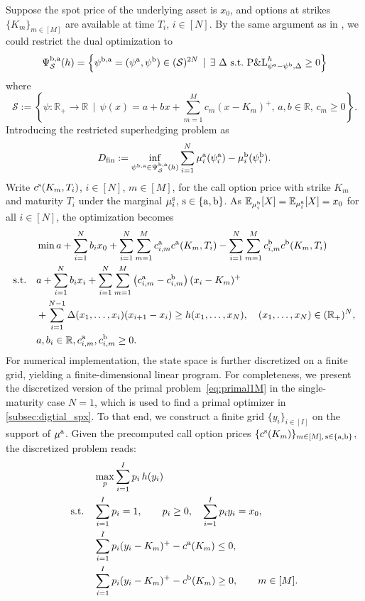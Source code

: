 \documentclass[11pt]{article}
\newcommand{\cS}{\mathcal{S}}
\newcommand{\R}{\mathbb{R}} %
\theoremstyle{plain}
\theoremstyle{definition}
\theoremstyle{remark}
\newcommand{\E}{\mathbb{E}}
\theoremstyle{plain}
\begin{document}
Suppose the spot price of the underlying asset is $x_0$, and options at strikes $\{K_{m}\}_{m\in[M]}$ are available at time $T_i$, $i\in [N]$. By the same argument as in \cite{beiglbock2013model}, we could restrict the dual optimization to 
\[
\Psi^{\rm b,a}_{\cS}(h) =\left\{\psi^{\rm b,a} =(\psi^{\rm a},\psi^{\rm b}) \in (\cS)^{2N}\,\mid\,  \exists\,\, \Delta\,\,{\rm s.t.}\,\, {\rm P\&L}^h_{\psi^{\rm a}-\psi^{\rm b}, \Delta}\geq 0\right\}
\]
where
\[
\cS :=\left\{\psi:\R_+\to \R\,\mid\, \psi(x)=a+ bx + \sum_{m=1}^M c_m(x-K_m)^+,\,a, b \in \R,\, c_m\geq 0\right\}.
\]
Introducing the restricted superhedging problem as
\begin{equation*}\label{eq:dual-finite}
    D_{\rm fin} := \inf_{\psi^{\rm b, a}\in \Psi^{\rm b,a}_{\cS}(h)} \sum_{i=1}^N\mu_i^{\rm a}(\psi_i^{\rm a}) - \mu_i^{\rm b}(\psi_i^{\rm b}).
\end{equation*}
Write $c^{\rm s}(K_{m},T_i)$, $i\in[N]$, $m\in[M]$, for the call option price with strike $K_{m}$ and maturity $T_i$ under the marginal $\mu_i^{\rm s}$, ${\rm s}\in\{{\rm a},{\rm b}\}$. 
  As $\E_{\mu_i^{\rm b}}[X] = \E_{\mu_i^{\rm a}}[X] = x_0$ for all $i\in [N]$, the optimization becomes
\begin{align*}
   &\min a + \sum_{i=1}^N b_ix_0 +  \sum_{i=1}^N \sum_{m=1}^M c_{i,m}^{\rm a} c^{\rm a}(K_{m}, T_i) - \sum_{i=1}^N \sum_{m=1}^M c_{i,m}^{\rm b} c^{\rm b}(K_{m}, T_i)\\
   {\rm s.t.}\quad &
a  + \sum_{i=1}^N b_ix_i +\sum_{i=1}^N \sum_{m=1}^M \left(c_{i,m}^{\rm a} - c_{i,m}^{\rm b} \right)(x_i - K_{m})^+\\
&+ \sum_{i=1}^{N-1} \Delta(x_1,\ldots, x_i)(x_{i+1} -x_i) \geq h(x_1,\ldots, x_N),\quad  (x_1,\ldots, x_N) \in (\R_+)^N,\\
&a, b_i \in \R, c_{i,m}^{\rm a}, c_{i,m}^{\rm b} \geq 0.
\end{align*}
For numerical implementation, the state space is further discretized on a finite grid, yielding a finite-dimensional linear program. For completeness, we present the discretized version of the primal problem~\eqref{eq:primal1M} in the single-maturity case $N=1$, which is used to find a primal optimizer in \cref{subsec:digtial_spx}. To that end, we construct a finite grid $\{y_i\}_{i\in[I]}$ on the support of $\mu^{\rm a}$. Given the precomputed call option prices $\{c^{\rm s}(K_m)\}_{m\in[M],\,{\rm s}\in\{{\rm a},{\rm b}\}}$, the discretized problem reads:
\begin{align*}
    &\max_{p} \sum_{i=1}^I p_i\, h(y_i)\\
    \text{s.t.}\quad 
    & \sum_{i=1}^I p_i = 1, \qquad p_i \geq 0,\quad \sum_{i=1}^I p_i y_i = x_0,\\
    & \sum_{i=1}^I p_i (y_i - K_m)^+ - c^{\rm a}(K_m) \leq 0,\\
    & \sum_{i=1}^I p_i (y_i - K_m)^+ - c^{\rm b}(K_m) \geq 0, \qquad m \in [M].
\end{align*}
\end{document}
